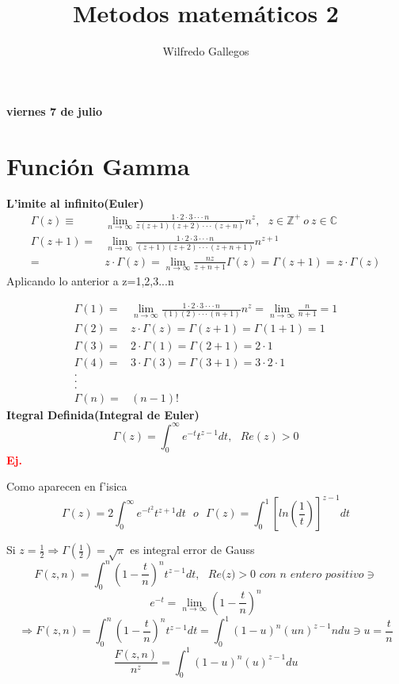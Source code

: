 \documentclass{article}
\title{Metodos matemáticos 2}
\author{Wilfredo Gallegos}
\theoremstyle{definition}
\begin{document}
\maketitle

\textbf{viernes 7 de julio}
\section{Función Gamma}
\textbf{L'imite al infinito(Euler)}\\

\[\begin{array}{rl}
	\Gamma (z)\equiv & \lim\limits_{n\to \infty} \frac{1\cdot 2\cdot 3\cdot\cdot\cdot n}{z(z+1)(z+2)\cdot\cdot\cdot (z+n)}n^z,\ \ \ z\in\mathbb{Z}^{+}\ o\ z\in\mathbb{C}\\
	\Gamma(z+1)=& \lim\limits_{n\to \infty} \frac{1\cdot 2\cdot 3\cdot\cdot\cdot n}{(z+1)(z+2)\cdot\cdot\cdot (z+n+1)}n^{z+1}\\
	=& z\cdot\Gamma (z)= \lim\limits_{n\to \infty}\frac{nz}{z+n+1}\Gamma (z)=\Gamma (z+1)=z\cdot\Gamma (z)
\end{array}\]
Aplicando lo anterior a z=1,2,3...n

\[\begin{array}{rl}

	\Gamma (1)=& \lim\limits_{n\to \infty} \frac{1\cdot 2\cdot 3\cdot\cdot\cdot n}{(1)(2)\cdot\cdot\cdot (n+1)}n^z= \lim\limits_{n\to \infty}\frac{n}{n+1}=1\\
	\Gamma (2)=& z\cdot \Gamma (z)= \Gamma (z+1)=\Gamma (1+1)=1\\
	\Gamma (3)=& 2\cdot \Gamma (1)= \Gamma (2+1)=2\cdot 1\\
	\Gamma (4)=& 3\cdot \Gamma (3)= \Gamma (3+1)=3\cdot 2\cdot 1\\
	.\\
	.\\
	.\\
	\Gamma (n)=&(n-1)!

\end{array}\]
\textbf{Itegral Definida(Integral de Euler)}
\[\Gamma (z)=\int^{\infty}_0 e^{-t}t^{z-1}dt,\ \ \ Re(z)>0\]
\textbf{\textcolor{red}{Ej.}} 

Como aparecen en f'isica
\[\Gamma (z)= 2\int^{\infty}_0 e^{-t^2}t^{z+1}dt\ \ \ o \ \ \ \Gamma (z) = \int^1_0\left[ln(\frac{1}{t})\right]^{z-1}dt\]

Si $z=\frac{1}{2}\Rightarrow \Gamma (\frac{1}{2}) = \sqrt{\pi}$ es integral error de Gauss
\[F(z,n)=\int^n_0\left(1-\frac{t}{n}\right)^nt^{z-1}dt,\ \ \ \textit{Re(z)}>\textit{0 con n entero positivo}\ni\]
\[e^{-t}=\lim\limits_{n\to \infty}\left(1-\frac{t}{n}\right)^n\]
\[\Rightarrow F(z,n)=\int^n_0\left(1-\frac{t}{n}\right)^nt^{z-1}dt = \int^1_0 (1-u)^n(un)^{z-1}ndu\ni u=\frac{t}{n}\]
\[\frac{F(z,n)}{n^z}=\int^1_0 (1-u)^n(u)^{z-1}du\]\\
\end{document}
